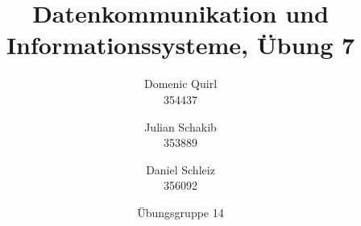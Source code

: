 \documentclass{../exercisesheet}
\title{Datenkommunikation und Informationssysteme, Übung 7}
\author{
    Domenic Quirl \\ 354437
    \and
    Julian Schakib \\ 353889
    \and 
    Daniel Schleiz \\ 356092
}
\date{Übungsgruppe 14}
\begin{document}
\maketitle
\pointtable


\begin{exercise}{1.5}
\begin{subexercise}

\end{subexercise}
\begin{subexercise}

\end{subexercise}
\begin{subexercise}

\end{subexercise}
\end{exercise}


\begin{exercise}{4}
\begin{subexercise}

\end{subexercise}
\begin{subexercise}

\end{subexercise}
\begin{subexercise}

\end{subexercise}
\begin{subexercise}

\end{subexercise}
\end{exercise}
\end{document}
